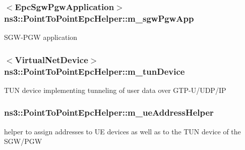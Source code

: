\subsubsection[{\texorpdfstring{m\+\_\+sgw\+Pgw\+App}{m_sgwPgwApp}}]{$<${\bf Epc\+Sgw\+Pgw\+Application}$>$ ns3\+::\+Point\+To\+Point\+Epc\+Helper\+::m\+\_\+sgw\+Pgw\+App\hspace{0.3cm}{\ttfamily [private]}}\hypertarget{classns3_1_1PointToPointEpcHelper_ae802bf7daf9022ab6d78333de1ac5a31}{}\label{classns3_1_1PointToPointEpcHelper_ae802bf7daf9022ab6d78333de1ac5a31}
S\+G\+W-\/\+P\+GW application 
\subsubsection[{\texorpdfstring{m\+\_\+tun\+Device}{m_tunDevice}}]{$<${\bf Virtual\+Net\+Device}$>$ ns3\+::\+Point\+To\+Point\+Epc\+Helper\+::m\+\_\+tun\+Device\hspace{0.3cm}{\ttfamily [private]}}\hypertarget{classns3_1_1PointToPointEpcHelper_a57d0bd3ff019f5bec7254f0d03414128}{}\label{classns3_1_1PointToPointEpcHelper_a57d0bd3ff019f5bec7254f0d03414128}
T\+UN device implementing tunneling of user data over G\+T\+P-\/\+U/\+U\+D\+P/\+IP 
\subsubsection[{\texorpdfstring{m\+\_\+ue\+Address\+Helper}{m_ueAddressHelper}}]{ ns3\+::\+Point\+To\+Point\+Epc\+Helper\+::m\+\_\+ue\+Address\+Helper\hspace{0.3cm}{\ttfamily [private]}}\hypertarget{classns3_1_1PointToPointEpcHelper_a622990871d0bc28bceae79accc9cdf43}{}\label{classns3_1_1PointToPointEpcHelper_a622990871d0bc28bceae79accc9cdf43}
helper to assign addresses to UE devices as well as to the T\+UN device of the S\+G\+W/\+P\+GW 
